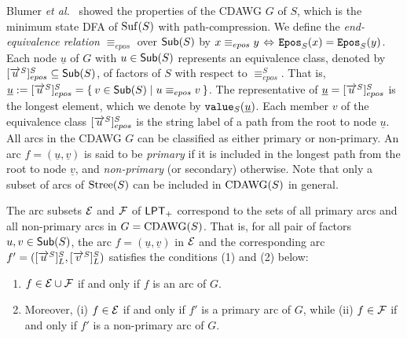 \documentclass{article}
\begin{document}
Blumer \textit{et al.}~\cite{blumer1987complete} showed the properties of the CDAWG $G$ of $S$, which is the minimum state DFA of $\mathrm{Suf}(S)$ with path-compression. We define the \textit{end-equivalence relation} $\equiv_{epos}$ over $\mathsf{Sub}(S)$ by $x \equiv_{epos} y \mathbin{\,\Leftrightarrow\,}\mathtt{Epos}_{S}(x) = \mathtt{Epos}_{S}(y)$.
Each node $\underline u$ of $G$ with $u \in \mathsf{Sub}(S)$ represents an equivalence class, denoted by $[\overrightarrow{u}^{S}]^S_{epos} \subseteq \mathsf{Sub}(S)$, of factors of $S$ with respect to $\equiv^S_{epos}$. That is, $\underline u := [\overrightarrow{u}^{S}]^S_{epos} = \{\kern0.2em v \in \mathsf{Sub}(S) \mid u \equiv_{epos} v\kern0.2em\}$.
The representative of $\underline u = [\overrightarrow{u}^{S}]^S_{epos}$ is the longest element, which we denote by $\mathtt{value}_{S}(\underline u)$. 
Each member $v$ of the equivalence class $[\overrightarrow{u}^{S}]^S_{epos}$ is the string label of a path from the root to node $\underline u$. 
All arcs in the CDAWG $G$ can be classified as either primary or non-primary. An arc $f = (\underline u, \underline v)$ is said to be \textit{primary} if it is included in the longest path from the root to node $\underline v$, and \textit{non-primary} (or secondary) otherwise.
Note that only a subset of arcs of $\mathrm{Stree}(S)$ can be included in $\mathrm{CDAWG}(S)$ in general. 

\begin{lemma}\label{lem:lpt:edge:classification}
  The arc subsets $\mathcal{E}$ and $\mathcal{F}$ of $\mathsf{LPT}_{+}$ correspond to the sets of all primary arcs and all non-primary arcs in $G = \mathrm{CDAWG}(S)$. That is, for all pair of factors $u, v\in \mathsf{Sub}(S)$, the arc $f = (\underline u, \underline v)$ in $\mathcal{E}$ and the corresponding arc $f' = ([\overrightarrow{u}^{S}]^S_L, [\overrightarrow{v}^{S}]^S_L)$ satisfies the conditions (1) and (2) below: 
\begin{enumerate}[(1)]  
\item $f \in \mathcal{E}\cup \mathcal{F}$ if and only if $f$ is an arc of $G$. 
\item Moreover, (i) $f \in \mathcal{E}$ if and only if $f'$ is a primary arc of $G$, while (ii) $f \in \mathcal{F}$ if and only if $f'$ is a non-primary arc of $G$.
\end{enumerate}
\end{lemma}
\end{document}
